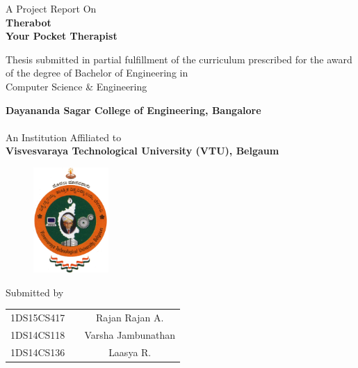 \begin{titlingpage}

\thispagestyle{empty}
\centering

\setlength{\toptafiddle}{1in}
\setlength{\bottafiddle}{1in}

\vspace*{-0.75in}
\enlargethispage{\toptafiddle}

\large A Project Report On\\
\Huge{\textbf{\textcolor{therablue}{Therabot}}}\\
\Large{\textbf{Your Pocket Therapist}}

\vfill

\large Thesis submitted in partial fulfillment of the curriculum
prescribed for the award of the degree of Bachelor of Engineering
in \\Computer Science \& Engineering

\textbf{Dayananda Sagar College of Engineering, Bangalore}\\
\hspace{0.1cm}\\
An Institution Affiliated to\\
\textbf{Visvesvaraya Technological University (VTU), Belgaum}\\

\vspace{0.4cm}

\vfill

\begin{figure}[h]
    \centering
    \includegraphics[height=4cm]{images/vtu.png}
\end{figure}

\vfill

\vfill

Submitted by\\
\begin{tabular}{ccc}
1DS15CS417 &  & Rajan Rajan A.\\
1DS14CS118 &  & Varsha Jambunathan\\
1DS14CS136 &  & Laasya R.\\
\end{tabular}


\end{titlingpage}
